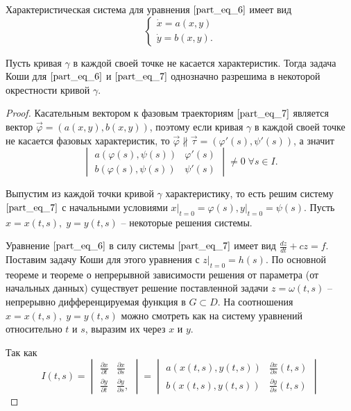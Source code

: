 Характеристическая система для уравнения $\eqref{part_eq_6}$ имеет вид
\begin{equation}
    \begin{cases}
        \dot{x} = a(x, y) \\
        \dot{y} = b(x, y).
    \end{cases}
    \label{part_eq_7}
\end{equation}

\begin{theorem}
    Пусть кривая $\gamma$ в каждой своей точке не касается характеристик. Тогда задача Коши для $\eqref{part_eq_6}$ и $\eqref{part_eq_7}$ однозначно разрешима в некоторой окрестности кривой $\gamma$.
\end{theorem}
\begin{proof}
	Касательным вектором к фазовым траекториям $\eqref{part_eq_7}$ является вектор $\vec{\varphi} = \left( a(x, y), b(x, y) \right)$, поэтому если кривая $\gamma$ в каждой своей точке не касается фазовых характеристик, то $\vec{\varphi} \nparallel \vec{\tau} = (\varphi'(s), \psi'(s))$, а значит
	\begin{equation}
		\begin{vmatrix}
			a(\varphi(s), \psi(s)) & \varphi'(s) \\
			b(\varphi(s), \psi(s)) & \psi'(s)
		\end{vmatrix} \neq 0\; \forall s \in I.
		\label{part_eq_8}
	\end{equation}
	
	Выпустим из каждой точки кривой $\gamma$ характеристику, то есть решим систему $\eqref{part_eq_7}$ с начальными условиями $x \big|_{t = 0} = \varphi(s), y \big|_{t = 0} = \psi(s)$. Пусть $x = x(t, s), \; y = y(t, s)$ -- некоторые решения системы.
	
	Уравнение $\eqref{part_eq_6}$ в силу системы $\eqref{part_eq_7}$ имеет вид $\frac{dz}{dt} + cz = f$. Поставим задачу Коши для этого уравнения с $z \big|_{t = 0} = h(s)$. По основной теореме и теореме о непрерывной зависимости решения от параметра (от начальных данных) существует решение поставленной задачи $z = \omega (t, s)$ -- непрерывно дифференцируемая функция в $G \subset D$. На соотношения $x = x(t, s), \; y = y(t, s)$ можно смотреть как на систему уравнений относительно $t$ и $s$, выразим их через $x$ и $y$.

    Так как
    \begin{equation*}
        I(t, s) =
        \begin{vmatrix}
            \frac{\partial x}{\partial t} & \frac{\partial x}{\partial s} \\
            \frac{\partial y}{\partial t} & \frac{\partial y}{\partial s},
        \end{vmatrix} =
        \begin{vmatrix}
            a(x(t, s), y(t, s)) & \frac{\partial x}{\partial s}(t, s) \\
            b(x(t, s), y(t, s)) & \frac{\partial y}{\partial s}(t, s)
        \end{vmatrix}
    \end{equation*}


\end{proof}
